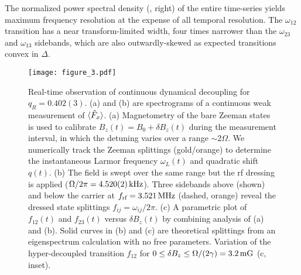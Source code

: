 \documentclass[aps,prl,reprint,superscriptaddress,floatfix]{revtex4-1}
\begin{document}
The normalized power spectral density (, right) of the entire time-series yields maximum frequency resolution at the expense of all temporal resolution.
The $\omega_{12}$ transition has a near transform-limited width, four times narrower than the $\omega_{23}$ and $\omega_{13}$ sidebands, which are also outwardly-skewed as expected transitions convex in $\Delta$. 
\begin{figure}
    \texttt{[image: figure\_3.pdf]}
    \caption{
    \label{fig:acquisition_pipeline}
        Real-time observation of continuous dynamical decoupling for $q_R = 0.402(3)$.
        (a) and (b) are spectrograms of a continuous weak measurement of $\langle \hat{F}_x \rangle$.
        (a) Magnetometry of the bare Zeeman states is used to calibrate $B_z(t) = B_0 + \delta B_z(t)$ during the measurement interval, in which the detuning varies over a range $\sim 2\Omega$.
        We numerically track the Zeeman splittings (gold/orange) to determine the instantaneous Larmor frequency $\omega_L(t)$ and quadratic shift $q(t)$.
       (b) The field is swept over the same range but the rf dressing is applied ($\Omega/2\pi = \unit[4.520(2)]{kHz}$).
       Three sidebands above (shown) and below the carrier at $f_{\text{rf}}=\unit[3.521]{MHz}$ (dashed, orange) reveal the dressed state splittings $f_{ij} = \omega_{ij}/2\pi$.
       (c) A parametric plot of $f_{12}(t)$ and $f_{23}(t)$ versus $\delta B_z(t)$ by combining analysis of (a) and (b).
       Solid curves in (b) and (c) are theoretical splittings from an eigenspectrum calculation with no free parameters.
       Variation of the hyper-decoupled transition $f_{12}$ for $0 \leq \delta B_z \leq \Omega/(2\gamma) = \unit[3.2]{mG}$ (c, inset).
    }
\end{figure}
\end{document}

